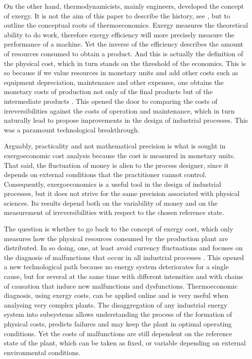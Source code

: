 \documentclass[energies,article,submit,moreauthors,pdftex]{Definitions/mdpi}
\begin{document}
On the other hand, thermodynamicists, mainly engineers, developed the concept of exergy. It is not the aim of this paper to describe the history, see \cite{Sciubba2007}, but to outline the conceptual roots of thermoeconomics. Exergy measures the theoretical ability to do work, therefore exergy efficiency will more precisely measure the performance of a machine. Yet the inverse of the efficiency describes the amount of resources consumed to obtain a product. And this is actually the definition of the physical cost, which in turn stands on the threshold of the economics. This is so because if we value resources in monetary units and add other costs such as equipment depreciation, maintenance and other expenses, one obtains the monetary costs of production not only of the final products but of the intermediate products \cite{Tribus1962,ElSayed1970a, Tsatsaronis1985b}. This opened the door to comparing the costs of irreversibilities against the costs of operation and maintenance, which in turn naturally lead to propose improvements in the design of industrial processes. This was a paramount technological breakthrough.

Arguably, practicality and not mathematical precision is what is sought in exergoeconomic cost analysis because the cost is measured in monetary units. That said, the fluctuation of money is alien to the process designer, since it depends on external conditions that the practitioner cannot control. Consequently, exergoeconomics is a useful tool in the design of industrial processes, but it does not strive for the same precision associated with physical sciences. Its results depend both on the variability of money and on the measurement of irreversibilities with respect to the chosen reference state.

The question is whether to go back to the concept of exergy cost, which only measures how the physical resources consumed by the production plant are distributed. In so doing, one, at least avoid currency fluctuations and focuses on the diagnosis of malfunctions that occur in all industrial processes \cite{Valero2004}. This opened a new technological path because no energy system deteriorates for a single cause, but for several at the same time with different intensities and with chains of causation that induce new malfunctions and dysfunctions. Thermoeconomic diagnosis, using exergy costs, can be applied online and is very useful when analysing very complex plants. The disaggregation of any industrial energy system into subsystems allows understanding the process of the formation of physical costs, predicts failures and may keep the plant in optimal operating conditions. Yet the costs of malfunctions are still dependent on the reference state of the plant, which can be taken as fixed, or variable depending on external environmental conditions.
\end{document}
